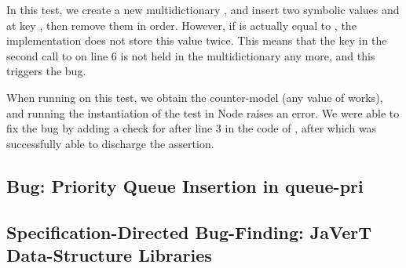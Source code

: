 In this test, we create a new multidictionary , and insert two symbolic values  and  at key , then remove them in order.
However, if  is actually equal to , the implementation does not store this value twice.
This means that the key in the second call to  on line 6 is not held in the multidictionary any more, and this triggers the bug.

When running \cosette on this test, we obtain the counter-model  (any value of  works), and running the instantiation of the test in Node raises an error.
We were able to fix the bug by adding a check for  after line 3 in the code of , after which \cosette was successfully able to discharge the assertion.

\subsection{Bug: Priority Queue Insertion in queue-pri}

\subsection{Specification-Directed Bug-Finding: JaVerT Data-Structure Libraries}



